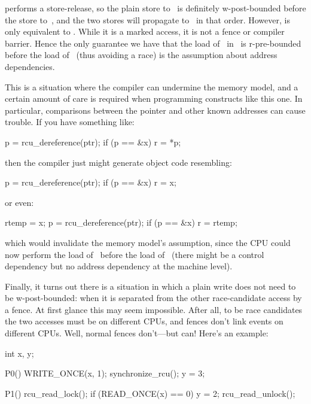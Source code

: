  performs a store-release, so the plain store to~
is definitely w-post-bounded before the store to~, and the two
stores will propagate to~ in that order.
However, 
is only equivalent to .
While it is a marked access, it is not a fence or compiler barrier.
Hence the only guarantee we have
that the load of~ in~ is r-pre-bounded before the load of~
(thus avoiding a race) is the assumption about address dependencies.

This is a situation where the compiler can undermine the memory model,
and a certain amount of care is required when programming constructs
like this one.
In particular, comparisons between the pointer and
other known addresses can cause trouble.
If you have something like:

\begin{VerbatimU}
	p = rcu_dereference(ptr);
	if (p == &x)
		r = *p;
\end{VerbatimU}

\noindent%
then the compiler just might generate object code resembling:

\begin{VerbatimU}
	p = rcu_dereference(ptr);
	if (p == &x)
		r = x;
\end{VerbatimU}

\noindent%
or even:

\begin{VerbatimU}
	rtemp = x;
	p = rcu_dereference(ptr);
	if (p == &x)
		r = rtemp;
\end{VerbatimU}

\noindent%
which would invalidate the memory model's assumption, since the CPU
could now perform the load of~ before the load of~ (there might be
a control dependency but no address dependency at the machine level).

Finally, it turns out there is a situation in which a plain write does
not need to be w-post-bounded{:} when it is separated from the other
race-candidate access by a fence.
At first glance this may seem
impossible.
After all, to be race candidates the two accesses must
be on different CPUs, and fences don't link events on different CPUs.
Well, normal fences don't---but  can!
Here's an example:

\begin{VerbatimU}
	int x, y;

	P0()
	{
		WRITE_ONCE(x, 1);
		synchronize_rcu();
		y = 3;
	}

	P1()
	{
		rcu_read_lock();
		if (READ_ONCE(x) == 0)
			y = 2;
		rcu_read_unlock();
	}
\end{VerbatimU}

